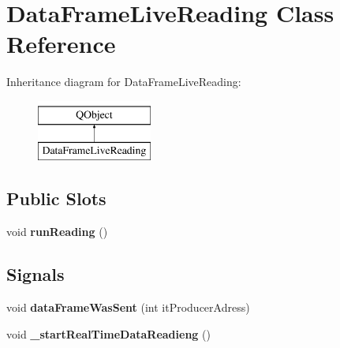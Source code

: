 \hypertarget{class_data_frame_live_reading}{}\section{Data\+Frame\+Live\+Reading Class Reference}
\label{class_data_frame_live_reading}
Inheritance diagram for Data\+Frame\+Live\+Reading\+:\begin{figure}[H]
\begin{center}
\leavevmode
\includegraphics[height=2.000000cm]{class_data_frame_live_reading}
\end{center}
\end{figure}
\subsection*{Public Slots}
\begin{DoxyCompactItemize}
\item 
\mbox{\label{class_data_frame_live_reading_a6cb9ca2bcd063eda36722cfdb64da7c7}} 
void {\bfseries run\+Reading} ()
\end{DoxyCompactItemize}
\subsection*{Signals}
\begin{DoxyCompactItemize}
\item 
\mbox{\label{class_data_frame_live_reading_a9818242eed05686ae0817cbf297bf36c}} 
void {\bfseries data\+Frame\+Was\+Sent} (int it\+Producer\+Adress)
\item 
\mbox{\label{class_data_frame_live_reading_a6a32d4c370ced816c82717d26d8d2458}} 
void {\bfseries \+\_\+start\+Real\+Time\+Data\+Readieng} ()
\end{DoxyCompactItemize}
